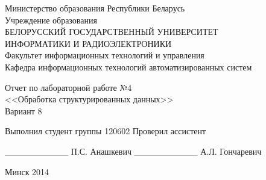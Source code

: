 \thispagestyle{empty}
\setlength{\parindent}{0ex} %

\begin{center}
  Министерство образования Республики Беларусь \\
  \smallskip
  Учреждение образования \\
  БЕЛОРУССКИЙ ГОСУДАРСТВЕННЫЙ УНИВЕРСИТЕТ \\
  ИНФОРМАТИКИ И РАДИОЭЛЕКТРОНИКИ \\
  \smallskip
  Факультет информационных технологий и управления \\
  \smallskip
  Кафедра информационных технологий автоматизированных систем
\end{center}

\vspace{50mm}

\begin{center}
  Отчет по лабораторной работе №4 \\
  <<Обработка структурированных данных>> \\
  Вариант 8
\end{center}

\vspace{45mm}

\begin{minipage}{.55\linewidth}
  Выполнил студент группы 120602
  \smallskip
  Проверил ассистент
\end{minipage}
\hfill
\begin{minipage}{.4\linewidth}
  \begin{flushright}
    \_\_\_\_\_\_\_\_\_\_ П.С. Анашкевич
    \smallskip
    \_\_\_\_\_\_\_\_\_\_ А.Л. Гончаревич
  \end{flushright}
\end{minipage}

\vspace{60mm}
\begin{center}
  Минск 2014
\end{center}

\setlength{\parindent}{5ex} %